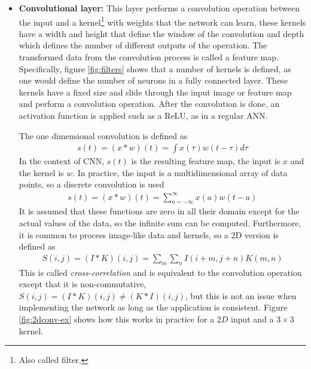 \begin{itemize}
    \item \textbf{Convolutional layer:} This layer performs a convolution operation between the input and a kernel\footnote{Also called filter.} with weights that the network can learn, these kernels have a width and height that define the window of the convolution and depth which defines the number of different outputs of the operation. The transformed data from the convolution process is called a feature map. Specifically, figure \ref{fig:filters} shows that a number of kernels is defined, as one would define the number of neurons in a fully connected layer. These kernels have a fixed size and slide through the input image or feature map and perform a convolution operation. After the convolution is done, an activation function is applied such as a ReLU, as in a regular ANN.
    
    The one dimensional convolution is defined as
    \begin{align*}
        s(t) = (x *w)(t)=\int x(\tau)w(t-\tau)d\tau
    \end{align*}
    In the context of CNN, $s(t)$ is the resulting feature map, the input is $x$ and the kernel is $w$. In practice, the input is a multidimensional array of data points, so a discrete convolution is used
    \begin{align*}
        s(t) = (x *w)(t)=\sum_{a=-\infty}^\infty x(a)w(t-a)
    \end{align*}
    It is assumed that these functions are zero in all their domain except for the actual values of the data, so the infinite sum can be computed. Furthermore, it is common to process image-like data and kernels, so a 2D version is defined as
    \begin{align*}
        S(i,j)=(I * K)(i,j)=\sum_{m}\sum_{n} I(i+m,j+n)K(m,n)
    \end{align*}
    This is called \textit{cross-correlation} and is equivalent to the convolution operation except that it is non-commutative, $S(i,j) = (I*K)(i,j)\neq (K*I) (i,j) $, but this is not an issue when implementing the network as long as the application is consistent. Figure \ref{fig:2dconv-ex} shows how this works in practice for a $2D$ input and a $3\times 3$ kernel.\\
    
    \begin{figure}
        

\end{figure}
\end{itemize}

